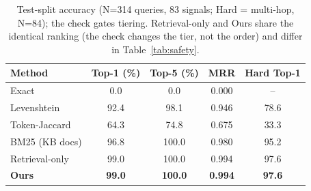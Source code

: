 \begin{table}[t]
\caption{Test-split accuracy (N=314 queries, 83 signals; Hard = multi-hop, N=84); the check gates tiering. Retrieval-only and Ours share the identical ranking (the check changes the tier, not the order) and differ in Table~\ref{tab:safety}.}
\label{tab:align}
\centering
\footnotesize
\setlength{\tabcolsep}{3.5pt}
\begin{tabular}{lcccc}
\toprule
Method & Top-1 (\%) & Top-5 (\%) & MRR & Hard Top-1 \\
\midrule
Exact & 0.0 & 0.0 & 0.000 & -- \\
Levenshtein & 92.4 & 98.1 & 0.946 & 78.6 \\
Token-Jaccard & 64.3 & 74.8 & 0.675 & 33.3 \\
BM25 (KB docs) & 96.8 & 100.0 & 0.980 & 95.2 \\
Retrieval-only & 99.0 & 100.0 & 0.994 & 97.6 \\
\textbf{Ours} & \textbf{99.0} & \textbf{100.0} & \textbf{0.994} & \textbf{97.6} \\
\bottomrule
\end{tabular}
\end{table}
